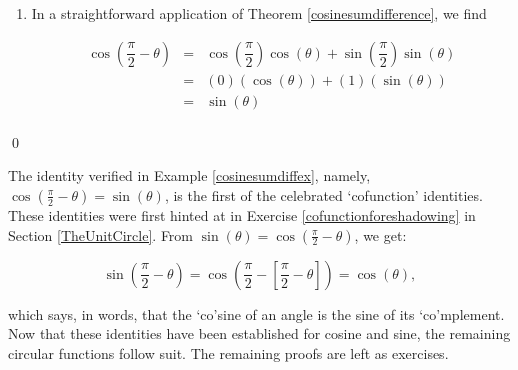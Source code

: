 \begin{ex}
\begin{enumerate}
\item  In a straightforward application of  Theorem \ref{cosinesumdifference}, we find

\[ \begin{array}{rcl}

\cos\left(\dfrac{\pi}{2} - \theta\right) & = & \cos\left(\dfrac{\pi}{2}\right)\cos\left(\theta\right) + \sin\left(\dfrac{\pi}{2}\right)\sin\left(\theta \right) \\ [10pt]
                            & = & \left( 0 \right)\left( \cos(\theta) \right)  +  \left( 1 \right)\left( \sin(\theta) \right) \\ [4pt]
														& = & \sin(\theta)    \\
\end{array} \]


\end{enumerate}

\vspace{-.25in}

\qed

\end{ex}

The identity verified in Example \ref{cosinesumdiffex}, namely, $\cos\left(\frac{\pi}{2} - \theta\right) = \sin(\theta)$,  is the first of the celebrated `cofunction' identities.  These identities were first hinted at in Exercise \ref{cofunctionforeshadowing} in Section \ref{TheUnitCircle}. From $ \sin(\theta) = \cos\left(\frac{\pi}{2} - \theta\right) $, we get:

\[ \sin\left(\dfrac{\pi}{2} - \theta\right) = \cos\left(\dfrac{\pi}{2} -\left[\dfrac{\pi}{2} - \theta\right]\right) = \cos(\theta),\]

which says, in words, that the `co'sine of an angle is the sine of its `co'mplement.  Now that these identities have been established for cosine and sine, the remaining circular functions follow suit.  The remaining proofs are left as exercises.

\medskip

